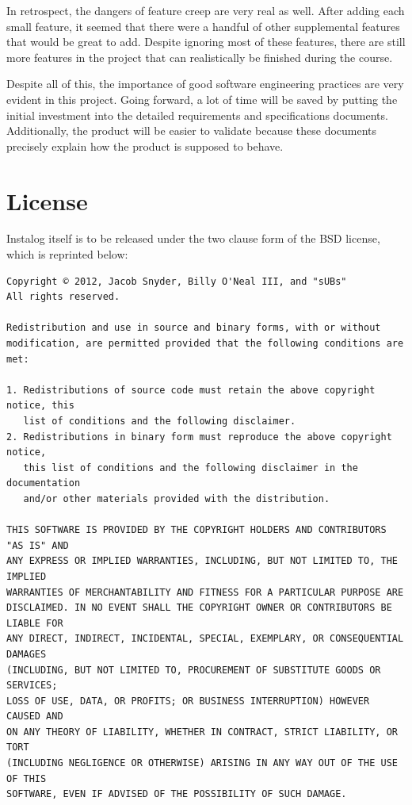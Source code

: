 \documentclass[letterpaper,12pt]{article}
\begin{document}
In retrospect, the dangers of feature creep are very real as well.  After adding
each small feature, it seemed that there were a handful of other supplemental
features that would be great to add.  Despite ignoring most of these features,
there are still more features in the project that can realistically be finished
during the course.  

Despite all of this, the importance of good software engineering practices are
very evident in this project.  Going forward, a lot of time will be saved by
putting the initial investment into the detailed requirements and specifications
documents.  Additionally, the product will be easier to validate because these
documents precisely explain how the product is supposed to behave. 

\newpage



\section{License} \label{license}
Instalog itself is to be released under the two clause form of the BSD license,
which is reprinted below:

\begin{verbatim}
Copyright © 2012, Jacob Snyder, Billy O'Neal III, and "sUBs"
All rights reserved.

Redistribution and use in source and binary forms, with or without
modification, are permitted provided that the following conditions are met: 

1. Redistributions of source code must retain the above copyright notice, this
   list of conditions and the following disclaimer. 
2. Redistributions in binary form must reproduce the above copyright notice,
   this list of conditions and the following disclaimer in the documentation
   and/or other materials provided with the distribution. 

THIS SOFTWARE IS PROVIDED BY THE COPYRIGHT HOLDERS AND CONTRIBUTORS "AS IS" AND
ANY EXPRESS OR IMPLIED WARRANTIES, INCLUDING, BUT NOT LIMITED TO, THE IMPLIED
WARRANTIES OF MERCHANTABILITY AND FITNESS FOR A PARTICULAR PURPOSE ARE
DISCLAIMED. IN NO EVENT SHALL THE COPYRIGHT OWNER OR CONTRIBUTORS BE LIABLE FOR
ANY DIRECT, INDIRECT, INCIDENTAL, SPECIAL, EXEMPLARY, OR CONSEQUENTIAL DAMAGES
(INCLUDING, BUT NOT LIMITED TO, PROCUREMENT OF SUBSTITUTE GOODS OR SERVICES;
LOSS OF USE, DATA, OR PROFITS; OR BUSINESS INTERRUPTION) HOWEVER CAUSED AND
ON ANY THEORY OF LIABILITY, WHETHER IN CONTRACT, STRICT LIABILITY, OR TORT
(INCLUDING NEGLIGENCE OR OTHERWISE) ARISING IN ANY WAY OUT OF THE USE OF THIS
SOFTWARE, EVEN IF ADVISED OF THE POSSIBILITY OF SUCH DAMAGE.
\end{verbatim}
\end{document}
